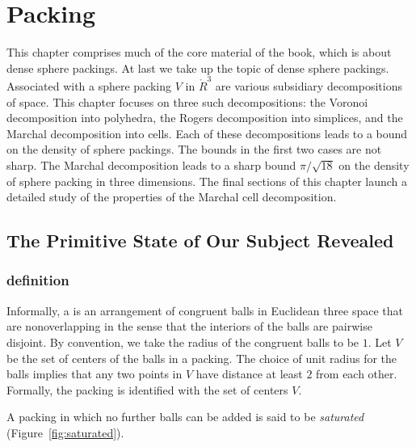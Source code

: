 
\chapter{Packing}

\begin{summary}
  This chapter comprises much of the core material of the book, which
  is about dense sphere packings.  At last we take up the topic of
  dense sphere packings.  Associated with a sphere packing $V$ in
  $\ring{R}^3$ are various subsidiary decompositions of space.  This
  chapter focuses on three such decompositions: the Voronoi
  decomposition into polyhedra, the Rogers decomposition into
  simplices, and the Marchal decomposition into cells.  Each of these
  decompositions leads to a bound on the density of sphere packings.
  The bounds in the first two cases are not sharp.  The Marchal
  decomposition leads to a sharp bound $\pi/\sqrt{18}$ on the density
  of sphere packing in three dimensions.  The final sections of this
  chapter launch a detailed study of the properties of the Marchal
  cell decomposition.
\end{summary}

\section{The Primitive State of Our Subject Revealed}


\subsection{definition}



Informally, a  is an arrangement of congruent
balls in Euclidean three space that are nonoverlapping in the sense
that the interiors of the balls are pairwise disjoint.  By convention,
we take the radius of the congruent balls to be $1$.
Let $ V$ be the set of centers of the balls in a
packing. The choice of unit radius for the
balls implies that any two points in $ V$ have distance  at
least $2$ from each other. 
 Formally, the packing is identified
with the set of centers $V$.
%

%
A packing in which no further balls can be added is said to be {\it
saturated} (Figure~\ref{fig:saturated}).

